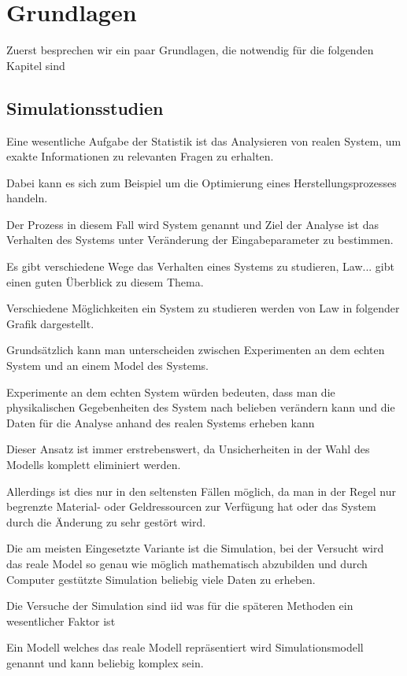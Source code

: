 \chapter{Grundlagen}
\label{chapter:kap2}

Zuerst besprechen wir ein paar Grundlagen, die notwendig für die folgenden Kapitel sind

\section{Simulationsstudien}
Eine wesentliche Aufgabe der Statistik ist das Analysieren von realen System, um exakte Informationen zu relevanten Fragen zu erhalten.

Dabei kann es sich zum Beispiel um die Optimierung eines Herstellungsprozesses handeln.

Der Prozess in diesem Fall wird System genannt und Ziel der Analyse ist das Verhalten des Systems unter Veränderung der Eingabeparameter zu bestimmen.

Es gibt verschiedene Wege das Verhalten eines Systems zu studieren, Law... gibt einen guten Überblick zu diesem Thema.

Verschiedene Möglichkeiten ein System zu studieren werden von Law in folgender Grafik dargestellt.

Grundsätzlich kann man unterscheiden zwischen Experimenten an dem echten System und an einem Model des Systems. 

Experimente an dem echten System würden bedeuten, dass man die physikalischen Gegebenheiten des System nach belieben verändern kann und die Daten für die Analyse anhand des realen Systems erheben kann

Dieser Ansatz ist immer erstrebenswert, da Unsicherheiten in der Wahl des Modells komplett eliminiert werden.

Allerdings ist dies nur in den seltensten Fällen möglich, da man in der Regel nur begrenzte Material- oder Geldressourcen zur Verfügung hat oder das System durch die Änderung zu sehr gestört wird.

Die am meisten Eingesetzte Variante ist die Simulation, bei der Versucht wird das reale Model so genau wie möglich mathematisch abzubilden und durch Computer gestützte Simulation beliebig viele Daten zu erheben.

Die Versuche der Simulation sind iid was für die späteren Methoden ein wesentlicher Faktor ist

Ein Modell welches das reale Modell repräsentiert wird Simulationsmodell genannt und kann beliebig komplex sein. 

